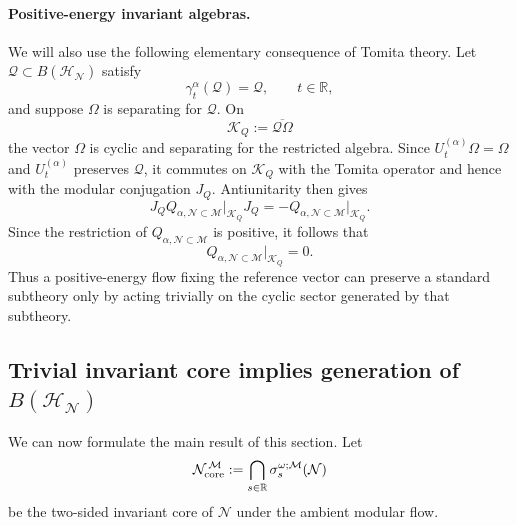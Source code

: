 \documentclass[a4paper,11pt]{article}
\theoremstyle{definition}
\newcommand{\mN}{\mathcal{N}}
\newcommand{\mH}{\mathcal{H}}
\newcommand{\mM}{\mathcal{M}}
\begin{document}
\paragraph{Positive-energy invariant algebras.}
We will also use the following elementary consequence of Tomita theory.
Let $\mathcal Q\subset B(\mH_{\mN})$ satisfy
\begin{equation}
    \gamma_t^\alpha(\mathcal Q)
    =
    \mathcal Q,
    \qquad
    t\in\mathbb R,
    \label{eq:Q-invariant-Halpha}
\end{equation}
and suppose $\Omega$ is separating for $\mathcal Q$. On
\begin{equation}
    \mathcal K_Q
    :=
    \overline{\mathcal Q\Omega}
\end{equation}
the vector $\Omega$ is cyclic and separating for the restricted algebra.
Since $U_t^{(\alpha)}\Omega=\Omega$ and
$U_t^{(\alpha)}$ preserves $\mathcal Q$, it commutes on
$\mathcal K_Q$ with the Tomita operator and hence with the modular
conjugation $J_Q$. Antiunitarity then gives
\begin{equation}
    J_Q
    Q_{\alpha,\mN\subset\mM}\big|_{\mathcal K_Q}
    J_Q
    =
    -
    Q_{\alpha,\mN\subset\mM}\big|_{\mathcal K_Q}.
\end{equation}
Since the restriction of $Q_{\alpha,\mN\subset\mM}$ is positive, it follows that
\begin{equation}
    \boxed{
    Q_{\alpha,\mN\subset\mM}\big|_{\mathcal K_Q}=0.
    }
    \label{eq:positive-H-invariant-Q}
\end{equation}
Thus a positive-energy flow fixing the reference vector can preserve a
standard subtheory only by acting trivially on the cyclic sector generated by
that subtheory.

\subsection{Trivial invariant core implies generation of $B(\mH_{\mN})$}

We can now formulate the main result of this section. Let
\begin{equation}
    \mN_{\rm core}^{\,\mM}
    :=
    \bigcap_{s\in\mathbb R}
    \sigma_s^{\omega;\mM}(\mN)
    \label{eq:ambient-memory-probing}
\end{equation}
be the two-sided invariant core of $\mN$ under the ambient modular flow.
\end{document}
